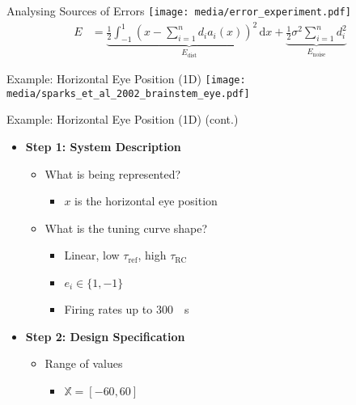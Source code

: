 \documentclass[handout,aspectratio=169]{beamer}
\begin{document}
\begin{frame}{Analysing Sources of Errors}
	\centering
	\texttt{[image: media/error\_experiment.pdf]}
	\begin{align*}
		E &= \underbrace{\frac{1}2 \int_{-1}^1 \left(x - \sum_{i = 1}^n d_i a_i(x) \right)^2 \,\mathrm{d}x}_{E_\mathrm{dist}} + \underbrace{\frac{1}2 \sigma^2 \sum_{i = 1}^n d_i^2}_{E_\mathrm{noise}}
	\end{align*}
\end{frame}

\begin{frame}{Example: Horizontal Eye Position (1D)}
	\texttt{[image: media/sparks\_et\_al\_2002\_brainstem\_eye.pdf]}
\end{frame}

\begin{frame}{Example: Horizontal Eye Position (1D) (cont.)}
	\begin{multicols}{2}
		\begin{itemize}
			\setlength{\itemsep}{0.5cm}
			\item \textbf{Step 1: System Description}
			\begin{itemize}
				\setlength{\itemsep}{0.5cm}
				\item What is being represented?
				\begin{itemize}
					\setlength{\itemsep}{0.25cm}
					\item $x$ is the horizontal eye position
				\end{itemize}
				\item What is the tuning curve shape?
				\begin{itemize}
					\setlength{\itemsep}{0.25cm}
					\item Linear, low $\tau_\mathrm{ref}$, high $\tau_\mathrm{RC}$
					\item $e_i \in \{1, -1\}$
					\item Firing rates up to \SI{300}{\per\second}
				\end{itemize}
			\end{itemize}
			\columnbreak
			\item \textbf{Step 2: Design Specification}
			\begin{itemize}
				\setlength{\itemsep}{0.25cm}
				\item Range of values
				\begin{itemize}
					\setlength{\itemsep}{0.25cm}
					\item $\mathbb{X} = [-60, 60]$
				\end{itemize}

\end{itemize}
\end{itemize}
\end{multicols}
\end{frame}
\end{document}

